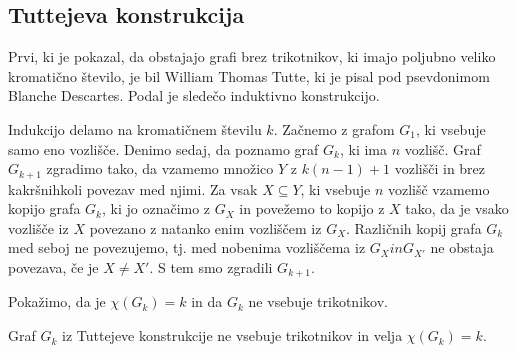 \documentclass[mat1, tisk]{fmfdelo}
\begin{document}
\subsection{Tuttejeva konstrukcija}
Prvi, ki je pokazal, da obstajajo grafi brez trikotnikov, ki imajo poljubno veliko kromatično število, je bil William Thomas Tutte, ki je
pisal pod psevdonimom Blanche Descartes. Podal je sledečo induktivno konstrukcijo.

Indukcijo delamo na kromatičnem številu $k$. Začnemo z grafom $G_1$, ki vsebuje samo eno vozlišče. Denimo sedaj, da poznamo graf $G_k$, 
ki ima $n$ vozlišč. Graf $G_{k+1}$ zgradimo tako, da vzamemo množico $Y$ z $k(n - 1) + 1$ vozlišči in brez kakršnihkoli povezav med njimi. 
Za vsak $X \subseteq Y$, ki vsebuje $n$ vozlišč vzamemo kopijo grafa $G_k$, ki jo označimo z $G_X$ in povežemo to kopijo z $X$ tako, da je 
vsako vozlišče iz $X$ povezano z natanko enim vozliščem iz $G_X$. Različnih kopij grafa $G_k$ med seboj ne povezujemo, tj. med nobenima 
vozliščema iz $G_X in G_{X'}$ ne obstaja povezava, če je $X \neq X'$. S tem smo zgradili $G_{k+1}$.

Pokažimo, da je $\chi(G_k) = k$ in da $G_k$ ne vsebuje trikotnikov.

    \begin{trditev}
        Graf $G_k$ iz Tuttejeve konstrukcije ne vsebuje trikotnikov in velja $\chi(G_k) = k$.
    \end{trditev}
    
\end{document}
